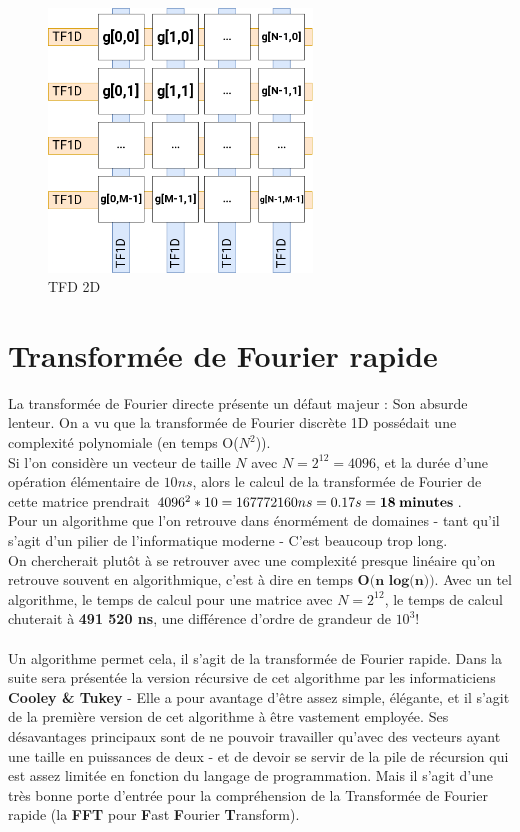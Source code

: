 \documentclass{article}
\begin{document}
\begin{figure}[!htb]
	\centering
	\includegraphics[height=7cm]{./assets/TFD2D.png}
	\caption{TFD 2D}
	\label{fig:TFD2D}
\end{figure}



\section{Transformée de Fourier rapide}

La transformée de Fourier directe présente un défaut majeur : Son absurde lenteur. On a vu que la transformée de Fourier discrète 1D possédait une complexité polynomiale (en temps O($N^2$)).\\
Si l'on considère un vecteur de taille $N$ avec $N = 2^{12} = 4096$, et la durée d'une opération élémentaire de $10ns$, alors le calcul de la transformée de Fourier de cette matrice prendrait $4096^2*10 = 167772160ns = 0.17s = \textbf{18\:minutes}$.\\
Pour un algorithme que l'on retrouve dans énormément de domaines - tant qu'il s'agit d'un pilier de l'informatique moderne - C'est beaucoup trop long.\\
On chercherait plutôt à se retrouver avec une complexité presque linéaire qu'on retrouve souvent en algorithmique, c'est à dire en temps $\textbf{O(n log(n))}$. Avec un tel algorithme, le temps de calcul pour une matrice avec $N = 2^{12}$, le temps de calcul chuterait à \textbf{491 520 ns}, une différence d'ordre de grandeur de $10^3$!\\~\\
Un algorithme permet cela, il s'agit de la transformée de Fourier rapide. Dans la suite sera présentée la version récursive de cet algorithme par les informaticiens \textbf{Cooley \& Tukey} - Elle a pour avantage d'être assez simple, élégante, et il s'agit de la première version de cet algorithme à être vastement employée. Ses désavantages principaux sont de ne pouvoir travailler qu'avec des vecteurs ayant une taille en puissances de deux - et de devoir se servir de la pile de récursion qui est assez limitée en fonction du langage de programmation.
Mais il s'agit d'une très bonne porte d'entrée pour la compréhension de la Transformée de Fourier rapide (la \textbf{FFT} pour \textbf{F}ast \textbf{F}ourier \textbf{T}ransform).\\
\end{document}
